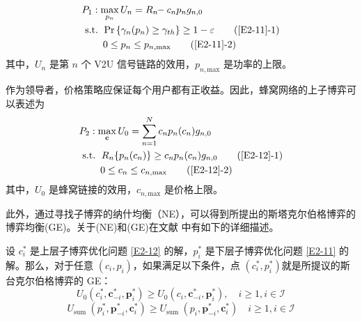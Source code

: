 \begin{align} \label{E2-11}
&P_1: \max\limits_{p_{n}} U_{n}=R_{n}\!\!-c_{n} p_n g_{n,0}                                                          \\
&\text { s.t. }
\quad \!\!\!\!\! \textrm{Pr}\left\{\gamma_{n}(p_n) \geq \gamma_{th}\right\}\geq1-\varepsilon  \tag{\ref{E2-11}{-1}}  \label{E2-11-1}\\
& \quad \quad \quad \!\!\!\!\! 0\leq p_n\leq p_{n,\textrm{max}}                               \tag{\ref{E2-11}{-2}}  \label{E2-11-2}
\end{align}
其中，$U_{n}$ 是第 $n$ 个 V2U 信号链路的效用，$p_{n,\textrm{max}}$ 是功率的上限。

作为领导者，价格策略应保证每个用户都有正收益。因此，蜂窝网络的上子博弈可以表述为
\begin{align} \label{E2-12}
&P_2: \max\limits_{\mathbf{c}} U_0=\sum\limits_{n=1}^N c_{n} p_n(c_{n}) g_{n,0}                    \\
& \text { s.t. }
\quad \!\!\!\!\! R_{n}\{p_n(c_{n})\} \geq c_{n} p_n(c_{n}) g_{n,0}          \tag{\ref{E2-12}{-1}}  \label{E2-12-1}\\  %
& \quad \quad \quad \!\!\!\!\! 0\leq c_n\leq c_{n,\textrm{max}}             \tag{\ref{E2-12}{-2}}  \label{E2-12-2}  %
\end{align}
其中，$U_{0}$ 是蜂窝链接的效用，$c_{n,\textrm{max}}$ 是价格上限。

此外，通过寻找子博弈的纳什均衡（NE），可以得到所提出的斯塔克尔伯格博弈的博弈均衡(GE)。关于(NE)和(GE)在文献 \cite{RAI}中有如下的详细描述。

设 $c_i^*$ 是上层子博弈优化问题 \eqref{E2-12} 的解，$p_i^*$ 是下层子博弈优化问题 \eqref{E2-11} 的解。那么，对于任意 $(c_i,p_i)$，如果满足以下条件，点 $(c_i^*,p_i^*)$就是所提议的斯台克尔伯格博弈的 GE：
\begin{equation} \label{E2-13}
U_0\left(c_i^*, \mathbf{c}_{-i}^*, \mathbf{p}_i^*\right) \geq U_0\left(c_i, \mathbf{c}_{-i}^*, \mathbf{p}_i^*\right), \quad i \geq 1, i \in \mathcal{I}
\end{equation}
\begin{equation} \label{E2-14}
U_{\text {sum }}\left(p_i^*, \mathbf{p}_{-i}^*, \mathbf{c}_i^*\right) \geq U_{\text {sum }}\left(p_i, \mathbf{p}_{-i}^*, \mathbf{c}_i^*\right) \quad i \geq 1, i \in \mathcal{I}
\end{equation}

